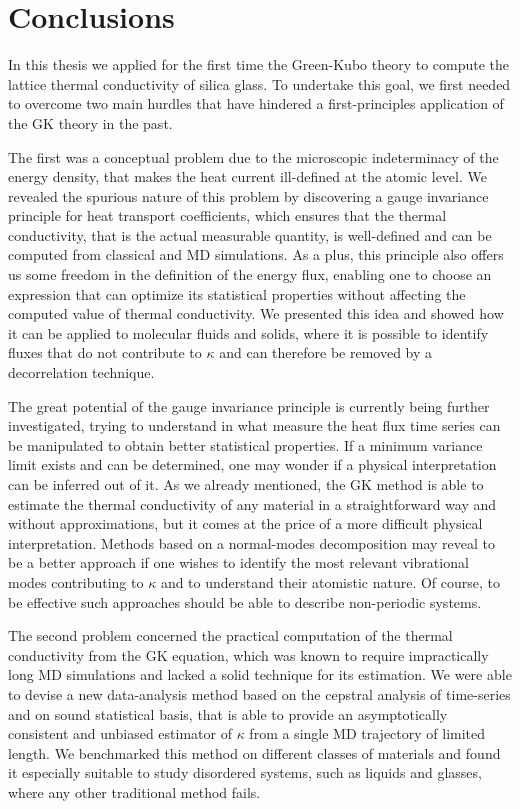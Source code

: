 \chapter{Conclusions}  \label{ch:conclusions}

In this thesis we applied for the first time the \abinitio Green-Kubo theory to compute the lattice thermal conductivity of silica glass. 
To undertake this goal, we first needed to overcome two main hurdles that have hindered a first-principles application of the GK theory in the past. 

The first was a conceptual problem due to the microscopic indeterminacy of the energy density, that makes the heat current ill-defined at the atomic level. 
We revealed the spurious nature of this problem by discovering a gauge invariance principle for heat transport coefficients, which ensures that the thermal conductivity, that is the actual measurable quantity, is well-defined and can be computed from classical and \abinitio MD simulations. 
As a plus, this principle also offers us some freedom in the definition of the energy flux, enabling one to choose an expression that can optimize its statistical properties without affecting the computed value of thermal conductivity. We presented this idea and showed how it can be applied to molecular fluids and solids, where it is possible to identify fluxes that do not contribute to $\kappa$ and can therefore be removed by a decorrelation technique.

The great potential of the gauge invariance principle is currently being further investigated, trying to understand in what measure the heat flux time series can be manipulated to obtain better statistical properties. If a minimum variance limit exists and can be determined, one may wonder if a physical interpretation can be inferred out of it. 
As we already mentioned, the GK method is able to estimate the thermal conductivity of any material in a straightforward way and without approximations, but it comes at the price of a more difficult physical interpretation. 
Methods based on a normal-modes decomposition \cite{AllenFeldman1989} may reveal to be a better approach if one wishes to identify the most relevant vibrational modes contributing to $\kappa$ and to understand their atomistic nature. 
Of course, to be effective such approaches should be able to describe non-periodic systems. 

The second problem concerned the practical computation of the thermal conductivity from the GK equation, which was known to require impractically long MD simulations and lacked a solid technique for its estimation. 
We were able to devise a new data-analysis method based on the cepstral analysis of time-series and on sound statistical basis, that is able to provide an asymptotically consistent and unbiased estimator of $\kappa$ from a single MD trajectory of limited length. 
We benchmarked this method on different classes of materials and found it especially suitable to study disordered systems, such as liquids and glasses, where any other traditional method fails. 

